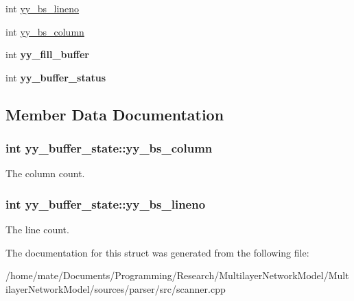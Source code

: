 \begin{DoxyCompactItemize}
\item 
int \hyperlink{structyy__buffer__state_a818e94bc9c766e683c60df1e9fd01199}{yy\+\_\+bs\+\_\+lineno}
\item 
int \hyperlink{structyy__buffer__state_a10c4fcd8be759e6bf11e6d3e8cdb0307}{yy\+\_\+bs\+\_\+column}
\item 
int {\bfseries yy\+\_\+fill\+\_\+buffer}\hypertarget{structyy__buffer__state_a63d2afbb1d79a3fc63df9e12626f827d}{}\label{structyy__buffer__state_a63d2afbb1d79a3fc63df9e12626f827d}

\item 
int {\bfseries yy\+\_\+buffer\+\_\+status}\hypertarget{structyy__buffer__state_a70fd925d37a2f0454fbd0def675d106c}{}\label{structyy__buffer__state_a70fd925d37a2f0454fbd0def675d106c}

\end{DoxyCompactItemize}


\subsection{Member Data Documentation}
\subsubsection[{\texorpdfstring{yy\+\_\+bs\+\_\+column}{yy_bs_column}}]{\setlength{\rightskip}{0pt plus 5cm}int yy\+\_\+buffer\+\_\+state\+::yy\+\_\+bs\+\_\+column}\hypertarget{structyy__buffer__state_a10c4fcd8be759e6bf11e6d3e8cdb0307}{}\label{structyy__buffer__state_a10c4fcd8be759e6bf11e6d3e8cdb0307}
The column count. 
\subsubsection[{\texorpdfstring{yy\+\_\+bs\+\_\+lineno}{yy_bs_lineno}}]{\setlength{\rightskip}{0pt plus 5cm}int yy\+\_\+buffer\+\_\+state\+::yy\+\_\+bs\+\_\+lineno}\hypertarget{structyy__buffer__state_a818e94bc9c766e683c60df1e9fd01199}{}\label{structyy__buffer__state_a818e94bc9c766e683c60df1e9fd01199}
The line count. 

The documentation for this struct was generated from the following file\+:\begin{DoxyCompactItemize}
\item 
/home/mate/\+Documents/\+Programming/\+Research/\+Multilayer\+Network\+Model/\+Multilayer\+Network\+Model/sources/parser/src/scanner.\+cpp\end{DoxyCompactItemize}

